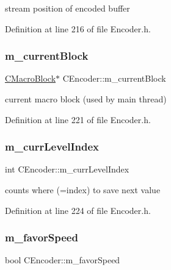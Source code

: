 stream position of encoded buffer 



Definition at line 216 of file Encoder.\+h.

\mbox{\label{classCEncoder_a55d6f2b3aeea93c52bd0a39af9f5db8b}} 
\subsubsection{\texorpdfstring{m\_currentBlock}{m\_currentBlock}}
{\footnotesize\ttfamily \mbox{\hyperlink{classCEncoder_1_1CMacroBlock}{C\+Macro\+Block}}$\ast$ C\+Encoder\+::m\+\_\+current\+Block\hspace{0.3cm}{\ttfamily [private]}}



current macro block (used by main thread) 



Definition at line 221 of file Encoder.\+h.

\mbox{\label{classCEncoder_a883026518a92ae6ed2aad8c9ed459b12}} 
\subsubsection{\texorpdfstring{m\_currLevelIndex}{m\_currLevelIndex}}
{\footnotesize\ttfamily int C\+Encoder\+::m\+\_\+curr\+Level\+Index\hspace{0.3cm}{\ttfamily [private]}}



counts where (=index) to save next value 



Definition at line 224 of file Encoder.\+h.

\mbox{\label{classCEncoder_a1d51c113f3f7f4f2c94bd7a8c05c12ee}} 
\subsubsection{\texorpdfstring{m\_favorSpeed}{m\_favorSpeed}}
{\footnotesize\ttfamily bool C\+Encoder\+::m\+\_\+favor\+Speed\hspace{0.3cm}{\ttfamily [private]}}



